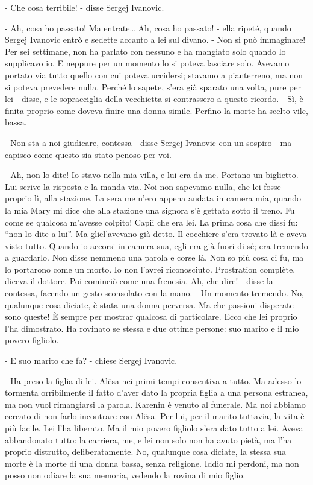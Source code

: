 - Che cosa terribile! - disse Sergej Ivanovic. 

- Ah, cosa ho passato! Ma entrate\ldots{} Ah, cosa ho passato! - ella ripeté, quando Sergej Ivanovic entrò e sedette accanto a lei sul divano. - Non si può immaginare! Per sei settimane, non ha parlato con nessuno e ha mangiato solo quando lo supplicavo io. E neppure per un momento lo si poteva lasciare solo. Avevamo portato via tutto quello con cui poteva uccidersi; stavamo a pianterreno, ma non si poteva prevedere nulla. Perché lo sapete, s'era già sparato una volta, pure per lei - disse, e le sopracciglia della vecchietta si contrassero a questo ricordo. - Sì, è finita proprio come doveva finire una donna simile. Perfino la morte ha scelto vile, bassa. 

- Non sta a noi giudicare, contessa - disse Sergej Ivanovic con un sospiro - ma capisco come questo sia stato penoso per voi. 

- Ah, non lo dite! Io stavo nella mia villa, e lui era da me. Portano un biglietto. Lui scrive la risposta e la manda via. Noi non sapevamo nulla, che lei fosse proprio lì, alla stazione. La sera me n'ero appena andata in camera mia, quando la mia Mary mi dice che alla stazione una signora s'è gettata sotto il treno. Fu come se qualcosa m'avesse colpito! Capii che era lei. La prima cosa che dissi fu: ``non lo dite a lui''. Ma gliel'avevano già detto. Il cocchiere s'era trovato là e aveva visto tutto. Quando io accorsi in camera sua, egli era già fuori di sé; era tremendo a guardarlo. Non disse nemmeno una parola e corse là. Non so più cosa ci fu, ma lo portarono come un morto. Io non l'avrei riconosciuto. Prostration complète, diceva il dottore. Poi cominciò come una frenesia. Ah, che dire! - disse la contessa, facendo un gesto sconsolato con la mano. - Un momento tremendo. No, qualunque cosa diciate, è stata una donna perversa. Ma che passioni disperate sono queste! È sempre per mostrar qualcosa di particolare. Ecco che lei proprio l'ha dimostrato. Ha rovinato se stessa e due ottime persone: suo marito e il mio povero figliolo. 

- E suo marito che fa? - chiese Sergej Ivanovic. 

- Ha preso la figlia di lei. Alësa nei primi tempi consentiva a tutto. Ma adesso lo tormenta orribilmente il fatto d'aver dato la propria figlia a una persona estranea, ma non vuol rimangiarsi la parola. Karenin è venuto al funerale. Ma noi abbiamo cercato di non farlo incontrare con Alësa. Per lui, per il marito tuttavia, la vita è più facile. Lei l'ha liberato. Ma il mio povero figliolo s'era dato tutto a lei. Aveva abbandonato tutto: la carriera, me, e lei non solo non ha avuto pietà, ma l'ha proprio distrutto, deliberatamente. No, qualunque cosa diciate, la stessa sua morte è la morte di una donna bassa, senza religione. Iddio mi perdoni, ma non posso non odiare la sua memoria, vedendo la rovina di mio figlio. 

